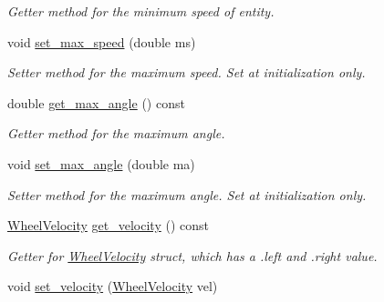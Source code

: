 \begin{DoxyCompactItemize}
\begin{DoxyCompactList}\small\item\em Getter method for the minimum speed of entity. \end{DoxyCompactList}\item 
void \hyperlink{classMotionHandler_a32e832d35e73e9db85c16b3ff569196e}{set\+\_\+max\+\_\+speed} (double ms)\hypertarget{classMotionHandler_a32e832d35e73e9db85c16b3ff569196e}{}\label{classMotionHandler_a32e832d35e73e9db85c16b3ff569196e}

\begin{DoxyCompactList}\small\item\em Setter method for the maximum speed. Set at initialization only. \end{DoxyCompactList}\item 
double \hyperlink{classMotionHandler_a55eb7aeb355b6ee86b2bd8751fde6cb5}{get\+\_\+max\+\_\+angle} () const \hypertarget{classMotionHandler_a55eb7aeb355b6ee86b2bd8751fde6cb5}{}\label{classMotionHandler_a55eb7aeb355b6ee86b2bd8751fde6cb5}

\begin{DoxyCompactList}\small\item\em Getter method for the maximum angle. \end{DoxyCompactList}\item 
void \hyperlink{classMotionHandler_aa73973c705626f1f95ac59391f23bcc9}{set\+\_\+max\+\_\+angle} (double ma)\hypertarget{classMotionHandler_aa73973c705626f1f95ac59391f23bcc9}{}\label{classMotionHandler_aa73973c705626f1f95ac59391f23bcc9}

\begin{DoxyCompactList}\small\item\em Setter method for the maximum angle. Set at initialization only. \end{DoxyCompactList}\item 
\hyperlink{structWheelVelocity}{Wheel\+Velocity} \hyperlink{classMotionHandler_a99fe1b248e817556de2b366a2d98c57c}{get\+\_\+velocity} () const \hypertarget{classMotionHandler_a99fe1b248e817556de2b366a2d98c57c}{}\label{classMotionHandler_a99fe1b248e817556de2b366a2d98c57c}

\begin{DoxyCompactList}\small\item\em Getter for \hyperlink{structWheelVelocity}{Wheel\+Velocity} struct, which has a .left and .right value. \end{DoxyCompactList}\item 
void \hyperlink{classMotionHandler_ac4bf67ba783c1afb5a5839229de3f3f9}{set\+\_\+velocity} (\hyperlink{structWheelVelocity}{Wheel\+Velocity} vel)\hypertarget{classMotionHandler_ac4bf67ba783c1afb5a5839229de3f3f9}{}\label{classMotionHandler_ac4bf67ba783c1afb5a5839229de3f3f9}


\end{DoxyCompactItemize}
